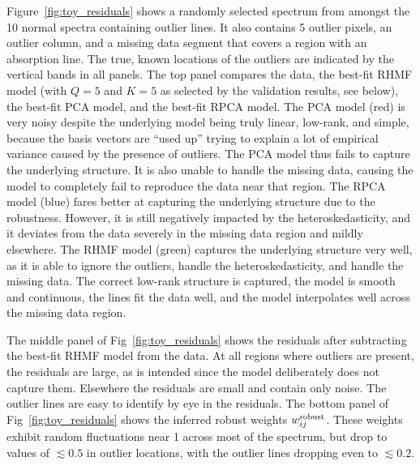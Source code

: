 \documentclass[onecolumn,floatfix]{aastex631}
\begin{document}
Figure~\ref{fig:toy_residuals} shows a randomly selected spectrum from amongst the 10 normal spectra containing outlier lines.
It also contains 5 outlier pixels, an outlier column, and a missing data segment that covers a region with an absorption line.
The true, known locations of the outliers are indicated by the vertical bands in all panels.
The top panel compares the data, the best-fit RHMF model (with $Q=5$ and $K=5$ as selected by the validation results, see below), the best-fit PCA model, and the best-fit RPCA model.
The PCA model (red) is very noisy despite the underlying model being truly linear, low-rank, and simple, because the basis vectors are ``used up'' trying to explain a lot of empirical variance caused by the presence of outliers.
The PCA model thus fails to capture the underlying structure.
It is also unable to handle the missing data, causing the model to completely fail to reproduce the data near that region.
The RPCA model (blue) fares better at capturing the underlying structure due to the robustness.
However, it is still negatively impacted by the heteroskedasticity, and it deviates from the data severely in the missing data region and mildly elsewhere.
The RHMF model (green) captures the underlying structure very well, as it is able to ignore the outliers, handle the heteroskedasticity, and handle the missing data.
The correct low-rank structure is captured, the model is smooth and continuous, the lines fit the data well, and the model interpolates well across the missing data region.

The middle panel of Fig~\ref{fig:toy_residuals} shows the residuals after subtracting the best-fit RHMF model from the data.
At all regions where outliers are present, the residuals are large, as is intended since the model deliberately does not capture them.
Elsewhere the residuals are small and contain only noise.
The outlier lines are easy to identify by eye in the residuals.
The bottom panel of Fig~\ref{fig:toy_residuals} shows the inferred robust weights $w_{ij}^{\rm robust}$.
These weights exhibit random fluctuations near 1 across most of the spectrum, but drop to values of $\lesssim 0.5$ in outlier locations, with the outlier lines dropping even to $\lesssim 0.2$.
\end{document}
